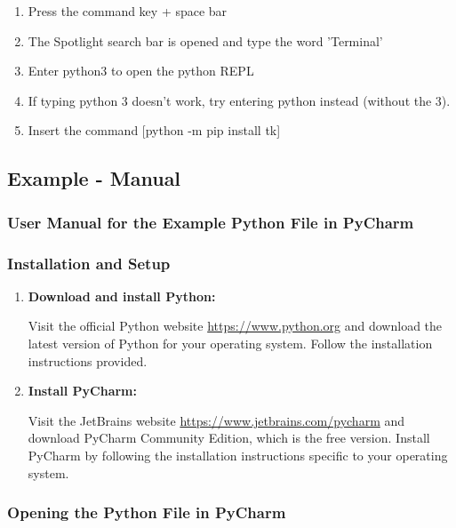 \begin{enumerate}
    \item Press the command key + space bar 
    \item The Spotlight search bar is opened and type the word 'Terminal'
    \item Enter python3 to open the python REPL
    \item If typing python 3 doesn’t work, try entering python instead (without the 3).
    \item Insert the command [python -m pip install tk]
\end{enumerate}

\subsection{Example - Manual}

\subsubsection{User Manual for the Example Python File in PyCharm}

\subsubsection{Installation and Setup}

\begin{enumerate}
    
    \item \textbf{Download and install Python:}
    
    Visit the official Python website \url{https://www.python.org} and download the latest version of Python for your operating system. Follow the installation instructions provided.
    
    \item \textbf{Install PyCharm: }
    
    Visit the JetBrains website \url{https://www.jetbrains.com/pycharm} and download PyCharm Community Edition, which is the free version. Install PyCharm by following the installation instructions specific to your operating system.
    
\end{enumerate}

\subsubsection{Opening the Python File in PyCharm}

